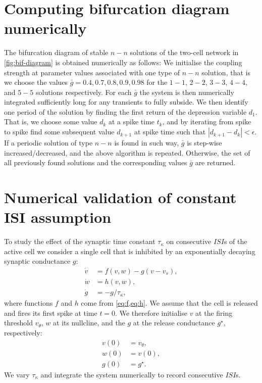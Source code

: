 \documentclass[utf8]{frontiers_suppmat} %
\begin{document}
\section{Computing bifurcation diagram numerically}\label{appendix2}
The bifurcation diagram of stable $n-n$ solutions of the two-cell network in \cref{fig:bif-diagram} is obtained numerically as follows:
We initialise the coupling strength at parameter values associated with one type of $n-n$ solution, that is we choose the values $\bar g = 0.4, 0.7, 0.8, 0.9, 0.98$ for the $1-1$, $2-2$, $3-3$, $4-4$, and $5-5$ solutions respectively.
For each $\bar g$ the system is then numerically integrated sufficiently long for any transients to fully subside.
We then identify one period of the solution by finding the first return of the depression variable $d_{1}$.
That is, we choose some value $d_{k}$ at a spike time $t_{k}$, and by iterating from spike to spike find some subsequent value $d_{k+1}$ at spike time such that $|d_{k+1}-d_{k}|<\epsilon$.
If a periodic solution of type $n-n$ is found in such way, $\bar g$ is step-wise increased/decreased, and the above algorithm is repeated.
Otherwise, the set of all previously found solutions and the corresponding values $\bar g$ are returned.

\section{Numerical validation of constant ISI assumption}
\label{sec:tauk}
To study the effect of the synaptic time constant $\tau_\kappa$ on consecutive $ISI$s of the active cell we consider a single cell that is inhibited by an exponentially decaying synaptic conductance $g$:
\begin{align}
	\label{eq:dotv}
	\dot v & = f(v, w) - g(v - v_{s}), \\
	\label{eq:dotw}
	\dot w & =h(v, w),                 \\
	\label{eq:dotg}
	\dot g & = -g/\tau_{\kappa},
\end{align}
where functions $f$ and $h$ come from \cref{eq:f,eq:h}.
We assume that the cell is released and fires its first spike at time $t=0$.
We therefore initialise $v$ at the firing threshold $v_{\theta}$, $w$ at its nullcline, and
the $g$ at the release conductance $g^{\star}$, respectively:
\begin{align}
	v(0) & = v_{\theta}, \\
	w(0) & = v(0),       \\
	g(0) & = g^{\star}.
\end{align}
We vary $\tau_{\kappa}$ and integrate the system numerically to record consecutive $ISI$s.
\end{document}
